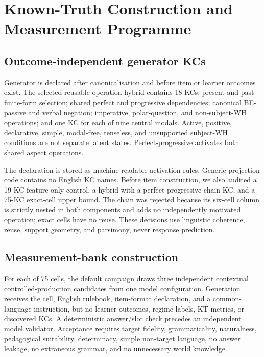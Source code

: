 \section{Known-Truth Construction and Measurement Programme}
\label{sec:method}

\subsection{Outcome-independent generator KCs}

Generator \kstar{} is declared after canonicalisation and before item or learner
outcomes exist.  The selected reusable-operation hybrid contains 18 KCs:
present and past finite-form selection; shared perfect and progressive
dependencies; canonical BE-passive and verbal negation; imperative,
polar-question, and non-subject-WH operations; and one KC for each of nine
central modals.  Active, positive, declarative, simple, modal-free, tenseless,
and unsupported subject-WH conditions are not separate latent states.
Perfect-progressive activates both shared aspect operations.

The declaration is stored as machine-readable activation rules.  Generic
projection code contains no English KC names.  Before item construction, we
also audited a 19-KC feature-only control, a hybrid with a
perfect-progressive-chain KC, and a 75-KC exact-cell upper bound.  The chain was
rejected because its six-cell column is strictly nested in both components and
adds no independently motivated operation; exact cells have no reuse.  These
decisions use linguistic coherence, reuse, support geometry, and parsimony,
never response prediction.

\subsection{Measurement-bank construction}
\label{sec:item-generation}

For each of 75 cells, the default campaign draws three independent contextual
controlled-production candidates from one model configuration.  Generation
receives the cell, English rulebook, item-format declaration, and a
common-language instruction, but no learner outcomes, regime labels, KT
metrics, or discovered KCs.  A deterministic answer/slot check precedes an
independent model validator.  Acceptance requires target fidelity,
grammaticality, naturalness, pedagogical suitability, determinacy, simple
non-target language, no answer leakage, no extraneous grammar, and no
unnecessary world knowledge.

